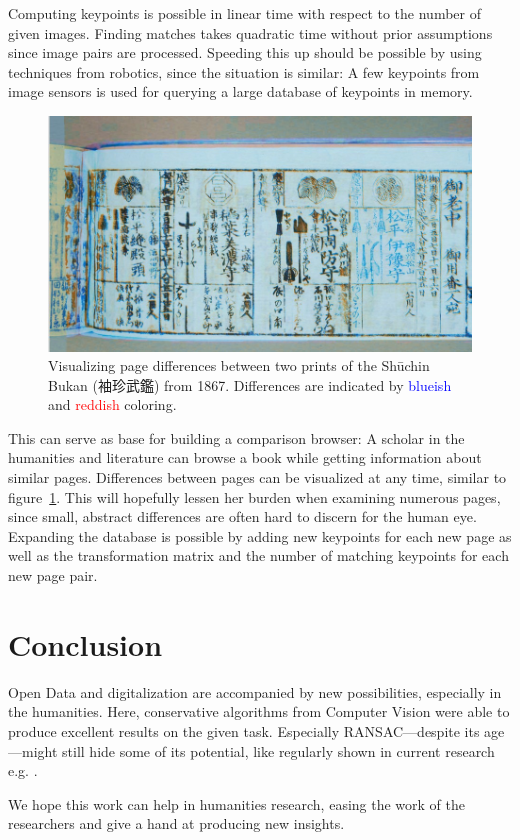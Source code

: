 \documentclass{ltjarticle}
\begin{document}
Computing keypoints is possible in linear time with respect to the number of given images. Finding matches takes quadratic time without prior assumptions since image pairs are processed. Speeding this up should be possible by using techniques from robotics, since the situation is similar: A few keypoints from image sensors is used for querying a large database of keypoints in memory.

\begin{figure}
    \centering
    \includegraphics[width=\textwidth]{200019646_00006}
    \caption[Visualizing page differences]{Visualizing page differences between two prints of the Shūchin Bukan (袖珍武鑑) from 1867. Differences are indicated by \textcolor{blue}{blueish} and \textcolor{red}{reddish} coloring.}
    \label{fig:page-compare}
\end{figure}

This can serve as base for building a comparison browser: A scholar in the humanities and literature can browse a book while getting information about similar pages. Differences between pages can be visualized at any time, similar to figure~\ref{fig:page-compare}. This will hopefully lessen her burden when examining numerous pages, since small, abstract differences are often hard to discern for the human eye. Expanding the database is possible by adding new keypoints for each new page as well as the transformation matrix and the number of matching keypoints for each new page pair.

\section{Conclusion}

Open Data and digitalization are accompanied by new possibilities, especially in the humanities. Here, conservative algorithms from Computer Vision were able to produce excellent results on the given task. Especially RANSAC---despite its age---might still hide some of its potential, like regularly shown in current research e.g. \cite{shen2019ransac}.

We hope this work can help in humanities research, easing the work of the researchers and give a hand at producing new insights.

\printbibliography
\end{document}
